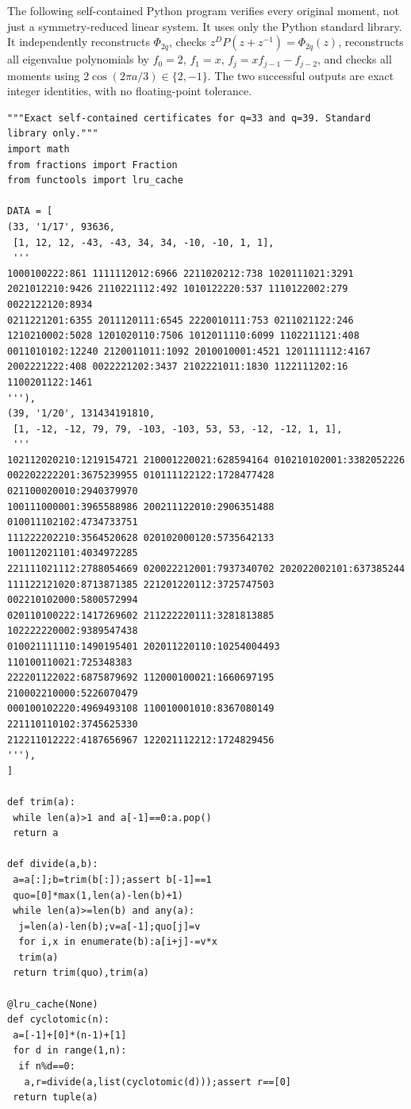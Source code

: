 \documentclass[11pt,a4paper]{article}
\theoremstyle{definition}\newtheorem{definition}[theorem]{Definition}
\theoremstyle{remark}\newtheorem{remark}[theorem]{Remark}
\begin{document}
The following self-contained Python program verifies every original moment,
not just a symmetry-reduced linear system. It uses only the Python standard
library. It independently reconstructs $\Phi_{2q}$, checks
$z^DP(z+z^{-1})=\Phi_{2q}(z)$, reconstructs all eigenvalue polynomials by
$f_0=2$, $f_1=x$, $f_j=xf_{j-1}-f_{j-2}$, and checks all moments using
$2\cos(2\pi a/3)\in\{2,-1\}$. The two successful outputs are exact integer
identities, with no floating-point tolerance.

{\footnotesize
\begin{verbatim}
"""Exact self-contained certificates for q=33 and q=39. Standard library only."""
import math
from fractions import Fraction
from functools import lru_cache

DATA = [
(33, '1/17', 93636,
 [1, 12, 12, -43, -43, 34, 34, -10, -10, 1, 1],
 '''
1000100222:861 1111112012:6966 2211020212:738 1020111021:3291
2021012210:9426 2110221112:492 1010122220:537 1110122002:279 0022122120:8934
0211221201:6355 2011120111:6545 2220010111:753 0211021122:246
1210210002:5028 1201020110:7506 1012011110:6099 1102211121:408
0011010102:12240 2120011011:1092 2010010001:4521 1201111112:4167
2002221222:408 0022221202:3437 2102221011:1830 1122111202:16 1100201122:1461
'''),
(39, '1/20', 131434191810,
 [1, -12, -12, 79, 79, -103, -103, 53, 53, -12, -12, 1, 1],
 '''
102112020210:1219154721 210001220021:628594164 010210102001:3382052226
002202222201:3675239955 010111122122:1728477428 021100020010:2940379970
100111000001:3965588986 200211122010:2906351488 010011102102:4734733751
111222202210:3564520628 020102000120:5735642133 100112021101:4034972285
221111021112:2788054669 020022212001:7937340702 202022002101:637385244
111122121020:8713871385 221201220112:3725747503 002210102000:5800572994
020110100222:1417269602 211222220111:3281813885 102222220002:9389547438
010021111110:1490195401 202011220110:10254004493 110100110021:725348383
222201122022:6875879692 112000100021:1660697195 210002210000:5226070479
000100102220:4969493108 110010001010:8367080149 221110110102:3745625330
212211012222:4187656967 122021112212:1724829456
'''),
]

def trim(a):
 while len(a)>1 and a[-1]==0:a.pop()
 return a

def divide(a,b):
 a=a[:];b=trim(b[:]);assert b[-1]==1
 quo=[0]*max(1,len(a)-len(b)+1)
 while len(a)>=len(b) and any(a):
  j=len(a)-len(b);v=a[-1];quo[j]=v
  for i,x in enumerate(b):a[i+j]-=v*x
  trim(a)
 return trim(quo),trim(a)

@lru_cache(None)
def cyclotomic(n):
 a=[-1]+[0]*(n-1)+[1]
 for d in range(1,n):
  if n%d==0:
   a,r=divide(a,list(cyclotomic(d)));assert r==[0]
 return tuple(a)


\end{verbatim}}
\end{document}
